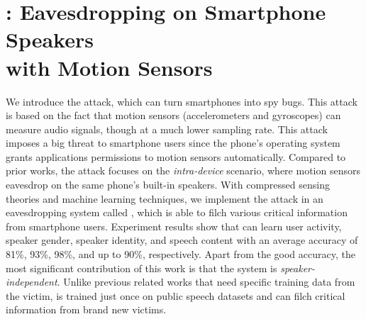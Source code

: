 \chapter{{\spp}: Eavesdropping on Smartphone Speakers\protect \\ with Motion Sensors}

We introduce the \textit{{\attackName}} attack, which can turn smartphones into spy bugs. This attack is based on the fact that motion sensors (accelerometers and gyroscopes) can measure audio signals, though at a much lower sampling rate. This attack imposes a big threat to smartphone users since the phone's operating system grants applications permissions to motion sensors automatically. Compared to prior works, the {\attackName} attack focuses on the \textit{intra-device} scenario, where motion sensors eavesdrop on the same phone's built-in speakers. With compressed sensing theories and machine learning techniques, we implement the attack in an eavesdropping system called {\textit{\systemName}}, which is able to filch various critical information from smartphone users. Experiment results show that {\systemName} can learn user activity, speaker gender, speaker identity, and speech content with an average accuracy of 81\%, 93\%, 98\%, and up to 90\%, respectively. Apart from the good accuracy, the most significant contribution of this work is that the {\systemName} system is \textit{speaker-independent}. Unlike previous related works that need specific training data from the victim, {\systemName} is trained just once on public speech datasets and can filch critical information from brand new victims.

%

%

%
	
%
	
%

%

%

%

